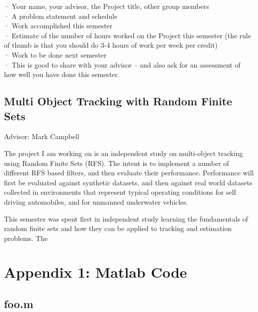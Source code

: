\documentclass{article}
\begin{document}
· Your name, your advisor, the Project title, other group members\\
· A problem statement and schedule\\
· Work accomplished this semester\\
· Estimate of the number of hours worked on the Project this semester (the rule of thumb is that you should do 3-4 hours of work per week per credit)\\
· Work to be done next semester\\
· This is good to share with your advisor – and also ask for an assessment of how well you have done this semester.\\

\begin{center}
  \section*{Multi Object Tracking with Random Finite Sets}
  Advisor: Mark Campbell
\end{center}


The project I am working on is an independent study on multi-object tracking using Random Finite Sets (RFS). The intent is to implement a number of different RFS based filters, and then evaluate their performance. Performance will first be evaluated against synthetic datasets, and then against real world datasets collected in environments that represent typical operating conditions for self driving automobiles, and for unmanned underwater vehicles.

This semester was spent first in independent study learning the fundamentals of random finite sets and how they can be applied to tracking and estimation problems. The \cite{cphd}
\section*{Appendix 1: Matlab Code}
\subsection*{foo.m}
\begin{lstlisting}[language=Matlab]
\end{lstlisting}
\end{document}
